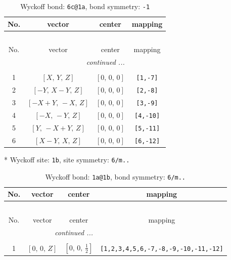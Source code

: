 \documentclass[fleqn,8pt]{jsarticle}
\begin{document}
\renewcommand{\arraystretch}{1.2}
\begin{longtable}{cccc}
\caption{Wyckoff bond: {\tt 6c@1a}, bond symmetry: {\tt -1}}
 \\
 \hline \hline
No. & vector & center & mapping \\ \hline \endfirsthead

\multicolumn{3}{l}{\tablename\ \thetable{}} \\
 \hline \hline
No. & vector & center & mapping \\ \hline \endhead

 \hline \hline
\multicolumn{3}{r}{\footnotesize\it continued ...} \\ \endfoot

 \hline \hline
\multicolumn{3}{r}{} \\ \endlastfoot

1 & $\left[ X,\, Y,\, Z \right]$ & $\left[ 0,\, 0,\, 0 \right]$ & {\tt [1,-7]} \\ \hline
2 & $\left[ - Y,\, X - Y,\, Z \right]$ & $\left[ 0,\, 0,\, 0 \right]$ & {\tt [2,-8]} \\ \hline
3 & $\left[ - X + Y,\, - X,\, Z \right]$ & $\left[ 0,\, 0,\, 0 \right]$ & {\tt [3,-9]} \\ \hline
4 & $\left[ - X,\, - Y,\, Z \right]$ & $\left[ 0,\, 0,\, 0 \right]$ & {\tt [4,-10]} \\ \hline
5 & $\left[ Y,\, - X + Y,\, Z \right]$ & $\left[ 0,\, 0,\, 0 \right]$ & {\tt [5,-11]} \\ \hline
6 & $\left[ X - Y,\, X,\, Z \right]$ & $\left[ 0,\, 0,\, 0 \right]$ & {\tt [6,-12]} \\
\end{longtable}
* Wyckoff site: {\tt 1b}, site symmetry: {\tt 6/m..}
\renewcommand{\arraystretch}{1.2}
\begin{longtable}{cccc}
\caption{Wyckoff bond: {\tt 1a@1b}, bond symmetry: {\tt 6/m..}}
 \\
 \hline \hline
No. & vector & center & mapping \\ \hline \endfirsthead

\multicolumn{3}{l}{\tablename\ \thetable{}} \\
 \hline \hline
No. & vector & center & mapping \\ \hline \endhead

 \hline \hline
\multicolumn{3}{r}{\footnotesize\it continued ...} \\ \endfoot

 \hline \hline
\multicolumn{3}{r}{} \\ \endlastfoot

1 & $\left[ 0,\, 0,\, Z \right]$ & $\left[ 0,\, 0,\, \frac{1}{2} \right]$ & {\tt [1,2,3,4,5,6,-7,-8,-9,-10,-11,-12]} \\
\end{longtable}
\end{document}
